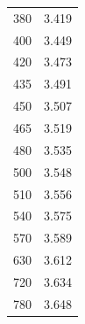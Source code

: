 \documentclass[titlepage]{article}
\begin{document}
{\begin{minipage}[h]{0.5\textwidth}
\begin{tabular}{c|c}
			380 & 3.419  \\
			400 & 3.449  \\
			420 & 3.473  \\
			435 & 3.491  \\
			450 & 3.507  \\
			465 & 3.519  \\
			480 & 3.535  \\
			500 & 3.548 \\
			510 & 3.556 \\
			540 & 3.575 \\
			570 & 3.589 \\
			630 & 3.612 \\
			720 & 3.634 \\
			780 & 3.648
		\end{tabular}
		\vspace{14.8cm}
	\end{minipage}
}
\end{document}
